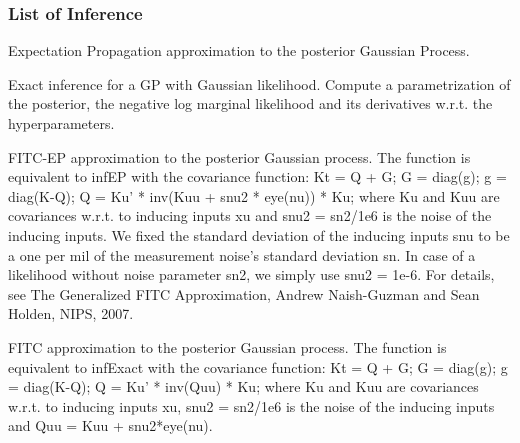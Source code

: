 \documentclass[letterpaper,10pt,english]{sphinxmanual}
\begin{document}
\subsubsection{List of Inference}
\label{Likelihoods:module-pyGPs.Core.inf}\label{Likelihoods:list-of-inference}

\begin{fulllineitems}
\label{Likelihoods:pyGPs.Core.inf.EP}
Expectation Propagation approximation to the posterior Gaussian Process.

\end{fulllineitems}


\begin{fulllineitems}
\label{Likelihoods:pyGPs.Core.inf.Exact}
Exact inference for a GP with Gaussian likelihood. Compute a parametrization
of the posterior, the negative log marginal likelihood and its derivatives
w.r.t. the hyperparameters.

\end{fulllineitems}


\begin{fulllineitems}
\label{Likelihoods:pyGPs.Core.inf.FITC_EP}
FITC-EP approximation to the posterior Gaussian process. The function is
equivalent to infEP with the covariance function:
Kt = Q + G; G = diag(g); g = diag(K-Q);  Q = Ku' * inv(Kuu + snu2 * eye(nu)) * Ku;
where Ku and Kuu are covariances w.r.t. to inducing inputs xu and
snu2 = sn2/1e6 is the noise of the inducing inputs. We fixed the standard
deviation of the inducing inputs snu to be a one per mil of the measurement 
noise's standard deviation sn. In case of a likelihood without noise
parameter sn2, we simply use snu2 = 1e-6.
For details, see The Generalized FITC Approximation, Andrew Naish-Guzman and
Sean Holden, NIPS, 2007.

\end{fulllineitems}


\begin{fulllineitems}
\label{Likelihoods:pyGPs.Core.inf.FITC_Exact}
FITC approximation to the posterior Gaussian process. The function is
equivalent to infExact with the covariance function:
Kt = Q + G; G = diag(g); g = diag(K-Q);  Q = Ku' * inv(Quu) * Ku; 
where Ku and Kuu are covariances w.r.t. to inducing inputs xu, snu2 = sn2/1e6
is the noise of the inducing inputs and Quu = Kuu + snu2*eye(nu).

\end{fulllineitems}
\end{document}
